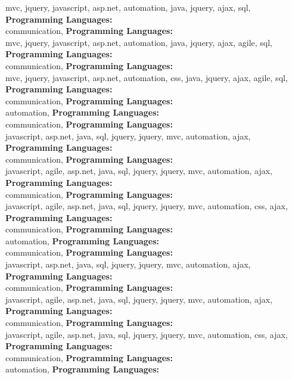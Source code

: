 mvc, jquery, javascript, asp.net, automation, java,  jquery, ajax, sql, \textbf{Programming Languages:} \\
 communication, \textbf{Programming Languages:} \\
mvc, jquery, javascript, asp.net, automation, java,  jquery, ajax, agile, sql, \textbf{Programming Languages:} \\
 communication, \textbf{Programming Languages:} \\
mvc, jquery, javascript, asp.net, automation, css, java,  jquery, ajax, agile, sql, \textbf{Programming Languages:} \\
 communication, \textbf{Programming Languages:} \\
automation, \textbf{Programming Languages:} \\
 communication, \textbf{Programming Languages:} \\
javascript, asp.net, java, sql,  jquery, jquery, mvc, automation, ajax, \textbf{Programming Languages:} \\
 communication, \textbf{Programming Languages:} \\
javascript, agile, asp.net, java, sql,  jquery, jquery, mvc, automation, ajax, \textbf{Programming Languages:} \\
 communication, \textbf{Programming Languages:} \\
javascript, agile, asp.net, java, sql,  jquery, jquery, mvc, automation, css, ajax, \textbf{Programming Languages:} \\
 communication, \textbf{Programming Languages:} \\
automation, \textbf{Programming Languages:} \\
 communication, \textbf{Programming Languages:} \\
javascript, asp.net, java, sql,  jquery, jquery, mvc, automation, ajax, \textbf{Programming Languages:} \\
 communication, \textbf{Programming Languages:} \\
javascript, agile, asp.net, java, sql,  jquery, jquery, mvc, automation, ajax, \textbf{Programming Languages:} \\
 communication, \textbf{Programming Languages:} \\
javascript, agile, asp.net, java, sql,  jquery, jquery, mvc, automation, css, ajax, \textbf{Programming Languages:} \\
 communication, \textbf{Programming Languages:} \\
automation, \textbf{Programming Languages:} \\
